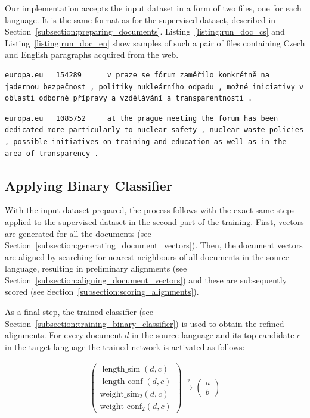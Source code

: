 Our implementation accepts the input dataset in a form of two files, one for each language. It is the same format as for the supervised dataset, described in Section~\ref{subsection:preparing_documents}. Listing~\ref{listing:run_doc_cs} and Listing~\ref{listing:run_doc_en} show samples of such a pair of files containing Czech and English paragraphs acquired from the web.
	
\begin{lstlisting}[float=!htb,caption={Sample from a file with Czech documents (running)},label={listing:run_doc_cs},firstnumber=154290]
europa.eu	154289		v praze se fórum zaměřilo konkrétně na jadernou bezpečnost , politiky nukleárního odpadu , možné iniciativy v oblasti odborné přípravy a vzdělávání a transparentnosti .
\end{lstlisting}

\begin{lstlisting}[float=!htb,caption={Sample from a file with English documents (running)},label={listing:run_doc_en},firstnumber=1085753]
europa.eu	1085752		at the prague meeting the forum has been dedicated more particularly to nuclear safety , nuclear waste policies , possible initiatives on training and education as well as in the area of transparency .
\end{lstlisting}

\subsection{Applying Binary Classifier}
\label{subsection:applying_binary_classifier}

With the input dataset prepared, the process follows with the exact same steps applied to the supervised dataset in the second part of the training. First, vectors are generated for all the documents (see Section~\ref{subsection:generating_document_vectors}). Then, the document vectors are aligned by searching for nearest neighbours of all documents in the source language, resulting in preliminary alignments (see Section~\ref{subsection:aligning_document_vectors}) and these are subsequently scored (see Section~\ref{subsection:scoring_alignments}).

As a final step, the trained classifier (see Section~\ref{subsection:training_binary_classifier}) is used to obtain the refined alignments. For every document $d$ in the source language and its top candidate $c$ in the target language the trained network is activated as follows:

\begin{align*}
\begin{pmatrix}
\operatorname{length\_sim}(d, c) \\
\operatorname{length\_conf}(d, c) \\
\operatorname{weight\_sim_2}(d, c) \\
\operatorname{weight\_conf_2}(d, c)
\end{pmatrix} \xrightarrow{?} \begin{pmatrix} a \\ b \end{pmatrix}
\end{align*}
	

